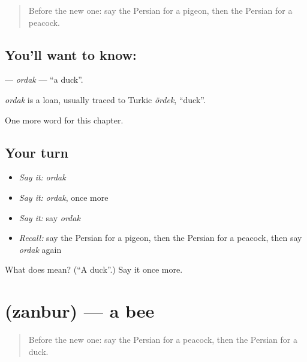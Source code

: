 \label{lesson:FA-C106-ordak}



\begin{quote}
Before the new one: say the Persian for a pigeon, then the Persian for a peacock.
\end{quote}

\subsection*{You'll want to know: }
\textbf{} — \emph{ordak} — \textquotedblleft{}a duck\textquotedblright{}.

\begin{cousinweb}
\emph{ordak} is a loan, usually traced to Turkic \emph{ördek}, \textquotedblleft{}duck\textquotedblright{}.
\end{cousinweb}

\begin{grammarlens}[title={What you've built}]
One more word for this chapter.
\end{grammarlens}

\subsection*{Your turn}
\begin{itemize}
\raggedright
  \item \emph{Say it:} \emph{ordak}
  \item \emph{Say it:} \emph{ordak}, once more
  \item \emph{Say it:} say \emph{ordak}
  \item \emph{Recall:} say the Persian for a pigeon, then the Persian for a peacock, then say \emph{ordak} again
\end{itemize}

\begin{tcolorbox}[breakable,colback=teal!4,colframe=teal!35!black,title={Before you move on}]
What does  mean? (\textquotedblleft{}A duck\textquotedblright{}.) Say it once more.
\end{tcolorbox}
\section[\texorpdfstring{\fa{زنبور} (zanbur)}{زنبور (zanbur)}]{ (zanbur) — a bee}

\label{lesson:FA-C106-zanbur}



\begin{quote}
Before the new one: say the Persian for a peacock, then the Persian for a duck.
\end{quote}

